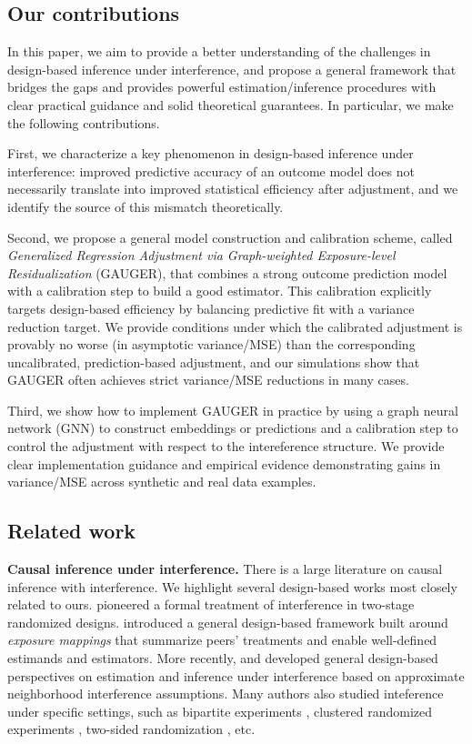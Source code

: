 \documentclass{article}
\theoremstyle{plain}
\theoremstyle{definition}
\theoremstyle{remark}
\begin{document}
\subsection{Our contributions}

In this paper, we aim to provide a better understanding of the challenges in design-based inference under interference, and propose a general framework that bridges the gaps and provides powerful estimation/inference procedures with clear practical guidance and solid theoretical guarantees. In particular, we make the following contributions.

First, we characterize a key phenomenon in design-based inference under interference: improved predictive accuracy of an outcome model does not necessarily translate into improved statistical efficiency after adjustment, and we identify the source of this mismatch theoretically.



Second, we propose a general model construction and calibration scheme, called \emph{Generalized Regression Adjustment via Graph-weighted Exposure-level Residualization} (GAUGER), that combines a strong outcome prediction model with a calibration step to build a good estimator. This calibration explicitly targets design-based efficiency by balancing predictive fit with a variance reduction target. We provide conditions under which the calibrated adjustment is provably no worse (in asymptotic variance/MSE) than the corresponding uncalibrated, prediction-based adjustment, and our simulations show that GAUGER often achieves strict variance/MSE reductions in many cases.


Third, we show how to implement GAUGER in practice by using a graph neural network (GNN) to construct embeddings or predictions and a calibration step to control the adjustment with respect to the intereference structure. We provide clear implementation guidance and empirical evidence demonstrating gains in variance/MSE across synthetic and real data examples.


\subsection{Related work}
\textbf{Causal inference under interference.} There is a large literature on causal inference with interference. We highlight several design-based works most closely related to ours. \citet{hudgens2008toward} pioneered a formal treatment of interference in two-stage randomized designs. \citet{aronow2017estimating} introduced a general design-based framework built around \emph{exposure mappings} that summarize peers’ treatments and enable well-defined estimands and estimators. More recently, \citet{leung2022causal} and \citet{gao2023causal} developed general design-based perspectives on estimation and inference under interference based on approximate neighborhood interference assumptions. Many authors also studied inteference under specific settings, such as bipartite experiments \citep{papadogeorgou2025causal, lu2025design}, clustered randomized experiments \citep{su2021model}, two-sided randomization \citep{Masoero2026multiple}, etc.
\end{document}
